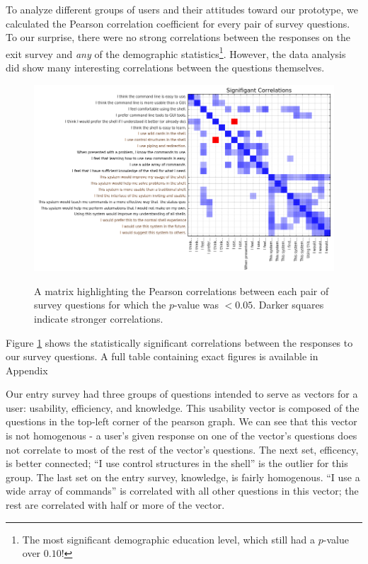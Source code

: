 To analyze different groups of users and their attitudes toward our prototype,
we calculated the Pearson correlation coefficient for every pair of survey
questions. To our surprise, there were no strong correlations between the
responses on the exit survey and \emph{any} of the demographic
statistics\footnote{The most significant demographic education level, which
  still had a $p$-value over $0.10$!}.  However, the data analysis did show many
interesting correlations between the questions themselves.

\begin{figure}[ht]
  \centering
  \includegraphics[width=\textwidth]{figures/stats/sig.png}
\label{fig:pvalplot}
  \caption{A matrix highlighting the Pearson correlations between each pair of
    survey questions for which the $p$-value was $< 0.05$. Darker squares
    indicate stronger correlations.}
\end{figure}

Figure \ref{fig:pvalplot} shows the statistically significant correlations between
the responses to our survey questions. A full table containing exact figures is
available in Appendix

Our entry survey had three groups of questions intended to serve as vectors for
a user: usability, efficiency, and knowledge. This usability vector is composed
of the questions in the top-left corner of the pearson graph. We can see that
this vector is not homogenous \-- a user's given response on one of the vector's
questions does not correlate to most of the rest of the vector's questions. The
next set, efficency, is better connected; ``I use control structures in the
shell'' is the outlier for this group. The last set on the entry survey,
knowledge, is fairly homogenous. ``I use a wide array of commands'' is correlated
with all other questions in this vector; the rest are correlated with half or
more of the vector.

